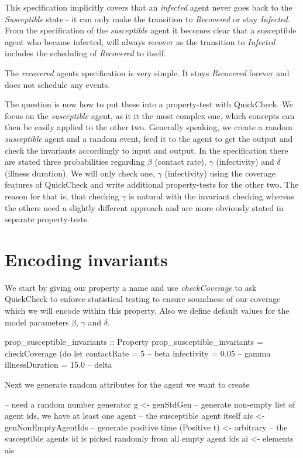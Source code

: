 This specification implicitly covers that an \textit{infected} agent never goes back to the \textit{Susceptible} state - it can only make the transition to \textit{Recovered} or stay \textit{Infected}. From the specification of the \textit{susceptible} agent it becomes clear that a susceptible agent who became infected, will always recover as the transition to \textit{Infected} includes the scheduling of \textit{Recovered} to itself. 

The \textit{recovered} agents specification is very simple. It stays \textit{Recovered} forever and does not schedule any events.

The question is now how to put these into a property-test with QuickCheck. We focus on the \textit{susceptible} agent, as it it the most complex one, which concepts can then be easily applied to the other two. Generally speaking, we create a random \textit{susceptible} agent and a random event, feed it to the agent to get the output and check the invariants accordingly to input and output. In the specification there are stated three probabilities regarding $\beta$ (contact rate), $\gamma$ (infectivity) and $\delta$ (illness duration). We will only check one, $\gamma$ (infectivity) using the coverage features of QuickCheck and write additional property-tests for the other two. The reason for that is, that checking $\gamma$ is natural with the invariant checking whereas the others need a slightly different approach and are more obviously stated in separate property-tests.

\section{Encoding invariants}
We start by giving our property a name and use \textit{checkCoverage} to ask QuickCheck to enforce statistical testing to ensure soundness of our coverage which we will encode within this property. Also we define default values for the model parameters $\beta$, $\gamma$ and $\delta$.

\begin{HaskellCode}
prop_susceptible_invariants :: Property
prop_susceptible_invariants = checkCoverage (do
  let contactRate     = 5     -- beta
      infectivity     = 0.05  -- gamma
      illnessDuration = 15.0  -- delta
\end{HaskellCode}

Next we generate random attributes for the agent we want to create

\begin{HaskellCode}
-- need a random number generator
g <- genStdGen
-- generate non-empty list of agent ids, we have at least one agent
-- the susceptible agent itself
ais <- genNonEmptyAgentIds
-- generate positive time
(Positive t) <- arbitrary
-- the susceptible agents id is picked randomly from all empty agent ids
ai <- elements ais 
\end{HaskellCode}

